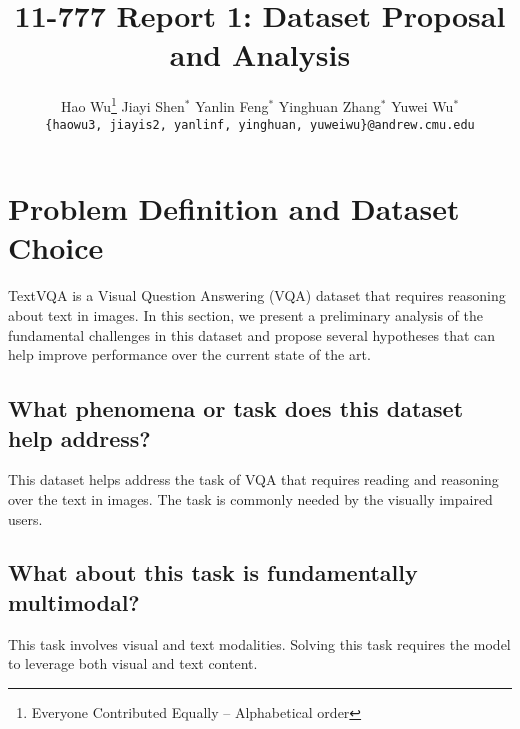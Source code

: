 \documentclass[11pt,a4paper]{article}
\title{11-777 Report 1: Dataset Proposal and Analysis}
\author{
  Hao Wu\thanks{\hspace{4pt}Everyone Contributed Equally -- Alphabetical order} \hspace{2em} Jiayi Shen$^*$ \hspace{2em} Yanlin Feng$^*$ \hspace{2em} Yinghuan Zhang$^*$ \hspace{2em} Yuwei Wu$^*$\\
  \texttt{\{haowu3, jiayis2, yanlinf, yinghuan, yuweiwu\}@andrew.cmu.edu}
  }
\date{}
\begin{document}
\maketitle

\section{Problem Definition and Dataset Choice}

TextVQA \cite{Singh_2019_CVPR} is a Visual Question Answering (VQA) dataset that requires reasoning about text in images. In this section, we present a preliminary analysis of the fundamental challenges in this dataset and propose several hypotheses that can help improve performance over the current state of the art.


\subsection{What phenomena or task does this dataset help address?}
This dataset helps address the task of VQA that requires reading and reasoning over the text in images. The task is commonly needed by the visually impaired users.
\subsection{What about this task is fundamentally multimodal?}
This task involves visual and text modalities. Solving this task requires the model to leverage both visual and text content. 
\end{document}
